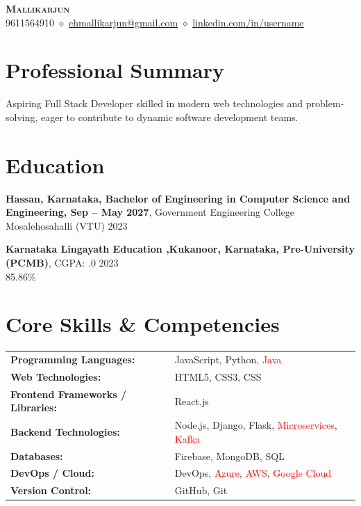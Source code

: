 \documentclass[10pt,a4paper]{article}
\begin{document}
\begin{center}
{\LARGE \textsc{\textbf{Mallikarjun}}} \\ \vspace{3pt}
9611564910 $\diamond$ \href{mailto:ehmallikarjun@gmail.com}{ehmallikarjun@gmail.com} $\diamond$ \href{https://linkedin.com/in/username}{linkedin.com/in/username}
\end{center}

\section*{Professional Summary}
Aspiring Full Stack Developer skilled in modern web technologies and problem-solving, eager to contribute to dynamic software development teams.

\section*{Education}
\noindent \textbf{Hassan, Karnataka, Bachelor of Engineering in Computer Science and Engineering, Sep  – May 2027}, Government Engineering College Mosalehosahalli (VTU) \hfill 2023 \\ \vspace{4pt}

\noindent \textbf{Karnataka Lingayath Education ,Kukanoor, Karnataka, Pre-University (PCMB)}, CGPA: .0 \hfill 2023 \\
\null \hfill 85.86\% \vspace{4pt}


\section*{Core Skills \& Competencies}
\begin{tabular}{@{}p{2.3in}p{4.5in}@{}}
\textbf{Programming Languages:} & JavaScript, Python, \textcolor{red}{Java} \\
\textbf{Web Technologies:} & HTML5, CSS3, CSS \\
\textbf{Frontend Frameworks / Libraries:} & React.js \\
\textbf{Backend Technologies:} & Node.js, Django, Flask, \textcolor{red}{Microservices}, \textcolor{red}{Kafka} \\
\textbf{Databases:} & Firebase, MongoDB, SQL \\
\textbf{DevOps / Cloud:} & DevOps, \textcolor{red}{Azure}, \textcolor{red}{AWS}, \textcolor{red}{Google Cloud} \\
\textbf{Version Control:} & GitHub, Git \\
\end{tabular}
\end{document}
